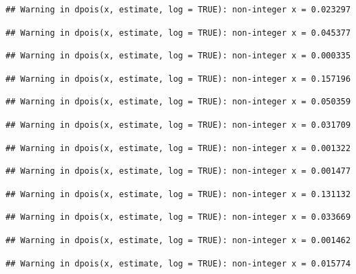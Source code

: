 \documentclass[]{article}
\begin{document}
\begin{verbatim}
## Warning in dpois(x, estimate, log = TRUE): non-integer x = 0.023297
\end{verbatim}

\begin{verbatim}
## Warning in dpois(x, estimate, log = TRUE): non-integer x = 0.045377
\end{verbatim}

\begin{verbatim}
## Warning in dpois(x, estimate, log = TRUE): non-integer x = 0.000335
\end{verbatim}

\begin{verbatim}
## Warning in dpois(x, estimate, log = TRUE): non-integer x = 0.157196
\end{verbatim}

\begin{verbatim}
## Warning in dpois(x, estimate, log = TRUE): non-integer x = 0.050359
\end{verbatim}

\begin{verbatim}
## Warning in dpois(x, estimate, log = TRUE): non-integer x = 0.031709
\end{verbatim}

\begin{verbatim}
## Warning in dpois(x, estimate, log = TRUE): non-integer x = 0.001322
\end{verbatim}

\begin{verbatim}
## Warning in dpois(x, estimate, log = TRUE): non-integer x = 0.001477
\end{verbatim}

\begin{verbatim}
## Warning in dpois(x, estimate, log = TRUE): non-integer x = 0.131132
\end{verbatim}

\begin{verbatim}
## Warning in dpois(x, estimate, log = TRUE): non-integer x = 0.033669
\end{verbatim}

\begin{verbatim}
## Warning in dpois(x, estimate, log = TRUE): non-integer x = 0.001462
\end{verbatim}

\begin{verbatim}
## Warning in dpois(x, estimate, log = TRUE): non-integer x = 0.015774
\end{verbatim}
\end{document}
